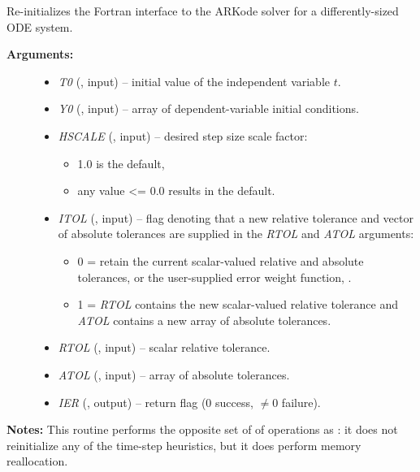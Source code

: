 \documentclass[letterpaper,10pt,english]{sphinxmanual}
\begin{document}
\begin{fulllineitems}
\label{f_interface/Usage:f/_/FARKRESIZE}
Re-initializes the Fortran interface to the ARKode solver for a
differently-sized ODE system.
\begin{description}
\item[{\textbf{Arguments:}}] \leavevmode\begin{itemize}
\item {} 
\emph{T0} (, input) -- initial value of the independent
variable \(t\).

\item {} 
\emph{Y0} (, input) -- array of dependent-variable
initial conditions.

\item {} 
\emph{HSCALE} (, input) -- desired step size scale factor:
\begin{itemize}
\item {} 
1.0 is the default,

\item {} 
any value \textless{}= 0.0 results in the default.

\end{itemize}

\item {} 
\emph{ITOL} (, input) -- flag denoting that a new relative
tolerance and vector of absolute tolerances are supplied in
the \emph{RTOL} and \emph{ATOL} arguments:
\begin{itemize}
\item {} 
0 = retain the current scalar-valued relative and absolute
tolerances, or the user-supplied error weight function,
{\hyperref[f_interface/Usage:f/_/FARKEWT]{\emph{}}}.

\item {} 
1 = \emph{RTOL} contains the new scalar-valued relative tolerance
and \emph{ATOL} contains a new array of absolute tolerances.

\end{itemize}

\item {} 
\emph{RTOL} (, input) -- scalar relative tolerance.

\item {} 
\emph{ATOL} (, input) -- array of absolute tolerances.

\item {} 
\emph{IER} (, output) -- return flag (0 success, \(\ne 0\) failure).

\end{itemize}

\end{description}

\textbf{Notes:}
This routine performs the opposite set of of operations as
{\hyperref[f_interface/Usage:f/_/FARKREINIT]{\emph{}}}: it does not reinitialize any of the
time-step heuristics, but it does perform memory reallocation.

\end{fulllineitems}
\end{document}
